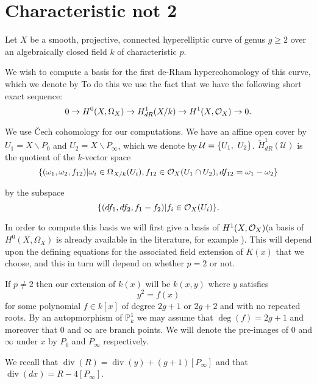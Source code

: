 \documentclass[draft, 11pt]{article} %
\title{}
\author{}
\theoremstyle{plain}
\theoremstyle{remark}
\newcommand{\cO}{{\cal O}}
\newcommand{\ra}{\rightarrow}
\newcommand{\cU}{{\mathcal U}}
\DeclareMathOperator{\di}{div}
\begin{document}
\maketitle

\section{Characteristic not 2}


Let $X$ be a smooth, projective, connected hyperelliptic curve of genus $g \geq 2$ over an algebraically closed field $k$ of characteristic $p$.

We wish to compute a basis for the first de-Rham hypercohomology of this curve, which we denote by  
To do this we use the fact that we have the following short exact sequence:
\begin{equation}\label{ses}
0 \ra H^0(X,\Omega_X) \ra H^1_{dR}(X/k) \ra H^1(X,\cO_X) \ra 0.
\end{equation}

We use \v{C}ech cohomology for our computations.
We have an affine open cover by $U_1 = X\backslash P_0$ and $U_2 = X \backslash P_\infty$, which we denote by ${\cal U} = \{ U_1, \ U_2\}$.
  $\check{H}_{dR}^1(\cU)$ is the quotient of the $k$-vector space 
\[
\{(\omega_1, \omega_2, f_{12}) | \omega_i\in \Omega_{X/k}(U_i), f_{12}\in \cO_X(U_1 \cap U_2), df_{12} = \omega_1 - \omega_2\}
\]

by the subspace
\[
\{ (df_1, df_2, f_1-f_2)|f_i \in \cO_X(U_i)\}.
\]

In order to compute this basis we will first give a basis of $H^1(X,\cO_X)$(a basis of $H^0(X,\Omega_X)$ is already available in the literature, for example ). This will depend upon the defining equations for the associated field extension of $K(x)$ that we choose, and this in turn will depend on whether $p=2$ or not.

If $p \neq 2$ then our extension of $k(x)$ will be $k(x,y)$ where $y$ satisfies 
\[
	y^2 = f(x)
\]
for some polynomial $f \in k[x]$ of degree $2g+1$ or $2g+2$ and with no repeated roots.
By an autopmorphism of $\mathbb P_k^1$ we may assume that $\deg(f) = 2g+1$ and moreover that $0$ and $\infty$ are branch points.
We will denote the pre-images of $0$ and $\infty$ under $x$ by $P_0$ and $P_\infty$ respectively.

We recall that $\di (R) = \di(y) + (g+1)[P_\infty]$ and that $\di( dx) = R - 4[P_\infty]$.
\end{document}
